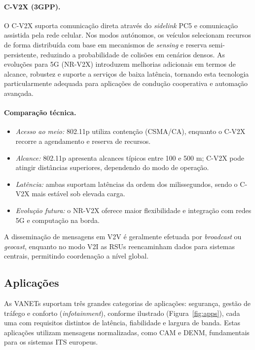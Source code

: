 \paragraph{C-V2X (3GPP).}
O C-V2X suporta comunicação direta através do \textit{sidelink} PC5 e comunicação assistida pela rede celular. Nos modos autónomos, os veículos selecionam recursos de forma distribuída com base em mecanismos de \textit{sensing} e reserva semi-persistente, reduzindo a probabilidade de colisões em cenários densos. As evoluções para 5G (NR-V2X) introduzem melhorias adicionais em termos de alcance, robustez e suporte a serviços de baixa latência, tornando esta tecnologia particularmente adequada para aplicações de condução cooperativa e automação avançada.

\paragraph{Comparação técnica.}
\begin{itemize}
    \item \textit{Acesso ao meio:} 802.11p utiliza contenção (CSMA/CA), enquanto o C-V2X recorre a agendamento e reserva de recursos.
    \item \textit{Alcance:} 802.11p apresenta alcances típicos entre 100 e 500 m; C-V2X pode atingir distâncias superiores, dependendo do modo de operação.
    \item \textit{Latência:} ambas suportam latências da ordem dos milissegundos, sendo o C-V2X mais estável sob elevada carga.
    \item \textit{Evolução futura:} o NR-V2X oferece maior flexibilidade e integração com redes 5G e computação na borda.
\end{itemize}

A disseminação de mensagens em \gls{V2V} é geralmente efetuada por \textit{broadcast} ou \textit{geocast}, enquanto no modo \gls{V2I} as \gls{RSUs} reencaminham dados para sistemas centrais, permitindo coordenação a nível global.

\subsection{Aplicações}
\label{sec:aplicacoes}

As \gls{VANETs} suportam três grandes categorias de aplicações: segurança, gestão de tráfego e conforto (\textit{infotainment}), conforme ilustrado (Figura~\ref{fig:apps}), cada uma com requisitos distintos de latência, fiabilidade e largura de banda. Estas aplicações utilizam mensagens normalizadas, como \gls{CAM} e \gls{DENM}, fundamentais para os sistemas ITS europeus.

